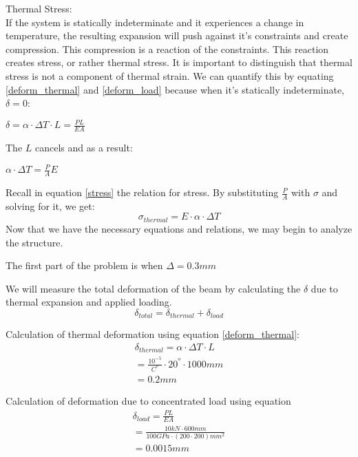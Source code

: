 \documentclass[12pt]{article}
\begin{document}
Thermal Stress:\\
If the system is statically indeterminate and it experiences a change in temperature, the resulting expansion will push against it's constraints and create compression. This compression is a reaction of the constraints. This reaction creates stress, or rather thermal stress. It is important to distinguish that thermal stress is not a component of thermal strain. We can quantify this by equating \ref{deform_thermal} and \ref{deform_load} because when it's statically indeterminate, $\delta = 0$:
\begin{center}
$\delta= \alpha \cdot \Delta T \cdot L = \frac{PL}{EA}$
\end{center}
The $L$ cancels and as a result:
\begin{center}
$\alpha \cdot \Delta T = \frac{P}{A} E$
\end{center}
Recall in equation \ref{stress} the relation for stress. By substituting $\frac{P}{A}$ with $\sigma$ and solving for it, we get:
\begin{equation} \label{thermal_stress}
\sigma_{thermal} = E \cdot  \alpha \cdot \Delta T
\end{equation}
Now that we have the necessary equations and relations, we may begin to analyze the structure.
\pagebreak

The first part of the problem is when $\Delta = 0.3 mm$
\newline

We will measure the total deformation of the beam by calculating the $\delta$ due to thermal expansion and applied loading.
\begin{equation}
\delta_{total} = \delta_{thermal} + \delta_{load}
\end{equation}

Calculation of thermal deformation using equation \ref{deform_thermal}:
\begin{gather*} \label{deform_thermal_calc_delta03}
\delta_{thermal} = \alpha \cdot \Delta T \cdot L \\
= \frac{10^{-5}}{C^{º}} \cdot 20^{º} \cdot 1000 mm \\
 = 0.2 mm
\end{gather*}

Calculation of deformation due to concentrated load using equation 
\begin{gather*} \label{deform_load_calc_delta03}
\delta_{load} = \frac{PL}{EA} \\
= \frac{10 kN \cdot 600 mm}{100 GPa \cdot (200 \cdot 200) mm^{2}} \\
=0.0015 mm
\end{gather*}
\end{document}
